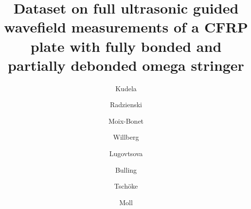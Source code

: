 \documentclass[times,final]{elsarticle}
\begin{document}

\begin{frontmatter}

\title{Dataset on full ultrasonic guided wavefield measurements of a CFRP plate with fully bonded and partially debonded omega stringer}%

\author[1]{Kudela }
\author[1]{Radzienski }
\author[2]{Moix-Bonet }
\author[2]{Willberg }
\author[3]{Lugovtsova }
\author[3]{Bulling }
\author[4]{Tsch\"oke }
\author[5]{Moll }

\address[1]{Institute of Fluid Flow Machinery, Polish Academy of Sciences, 80-231 Gdansk, Poland}
\address[2]{Institute of Composite Structures and Adaptative Systems,
	German Aerospace Center, 38108 Braunschweig, Germany}
\address[3]{Federal Institute for Materials Research and Testing (BAM), 12205 Berlin, Germany}
\address[4]{Fraunhofer Institute for Ceramic Technologies and Systems IKTS, Systems for Condition Monitoring, 01109 Dresden, Germany}
\address[5]{J.W. Goethe-University, Department of Physics, 60438 Frankfurt, Germany}




\end{frontmatter}
\end{document}
